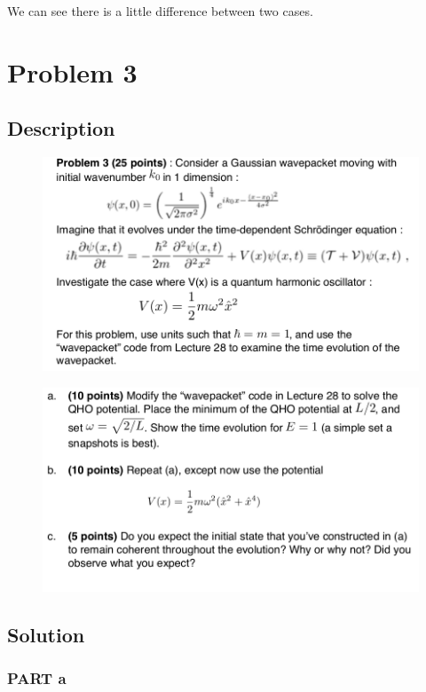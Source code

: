 \documentclass[11pt,letterpaper]{article}
\begin{document}
We can see there is a little difference between two cases.



\section{Problem 3}
\subsection{Description}

\begin{figure}
\begin{center}
\includegraphics[width=0.8\linewidth,angle=0]{3a.png}
\label{figure6}
\end{center}
\end{figure}

\begin{figure}
\begin{center}
\includegraphics[width=0.8\linewidth,angle=0]{3b.png}
\label{figure7}
\end{center}
\end{figure}


\subsection{Solution}

\subsubsection{PART a}
\end{document}
